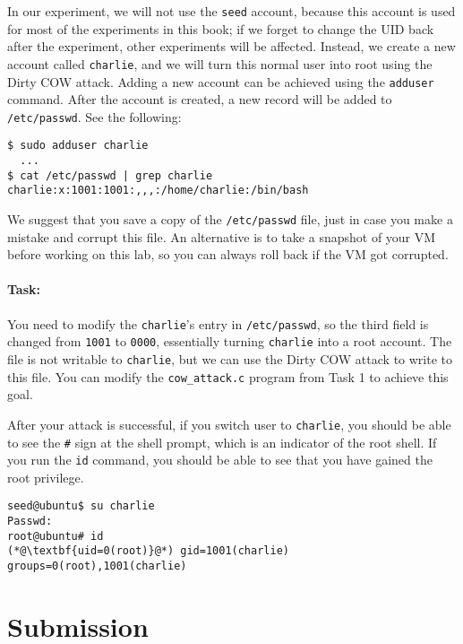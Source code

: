 In our experiment, we will not use the \texttt{seed} account, because this account is used
for most of the experiments in this book; if we forget to change the UID back after the
experiment, other experiments will be affected.  Instead, we create a new account called
\texttt{charlie}, and we will turn this normal user into root using
the Dirty COW attack.
Adding a new account can be achieved using the \texttt{adduser} command.
After the account is created, a new
record will be added to \texttt{/etc/passwd}.  See
the following:

\begin{lstlisting}
$ sudo adduser charlie
  ...
$ cat /etc/passwd | grep charlie
charlie:x:1001:1001:,,,:/home/charlie:/bin/bash
\end{lstlisting}

We suggest that you save a copy of the \texttt{/etc/passwd} file, just in case you 
make a mistake and corrupt this file. An alternative is to take a snapshot of your VM before
working on this lab, so you can always roll back if the VM got corrupted. 



\paragraph{Task:} You need to modify the \texttt{charlie}'s entry in
\texttt{/etc/passwd}, so the third field is changed from \texttt{1001} to 
\texttt{0000}, essentially turning \texttt{charlie} into a root account. 
The file is not writable to \texttt{charlie}, but we can use 
the Dirty COW attack to write to this file. You can  
modify the \texttt{cow\_attack.c} program from Task 1 to achieve 
this goal. 

After your attack is successful, if you switch user to \texttt{charlie}, you should be able to see the 
\texttt{\#} sign at the shell prompt, which is an indicator of the root shell. If you 
run the \texttt{id} command, you should be able to see that you have gained the root privilege. 

\begin{lstlisting}
seed@ubuntu$ su charlie
Passwd: 
root@ubuntu# id
(*@\textbf{uid=0(root)}@*) gid=1001(charlie) groups=0(root),1001(charlie)
\end{lstlisting}
 


\section{Submission}






